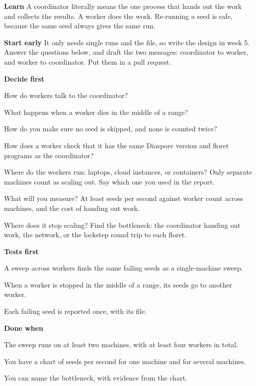 \documentclass[11pt,letterpaper]{article}
\newcommand{\code}[1]{\texttt{\detokenize{#1}}}
\newcommand{\lbl}[1]{\textbf{#1}\enspace}
\begin{document}
\lbl{Learn} A coordinator literally means the one process that hands out the work and collects the results. A worker does the work. Re-running a seed is safe, because the same seed always gives the same run.

\lbl{Start early} It only needs single runs and the \code{.pappus} file, so write the design in week 5. Answer the questions below, and draft the two messages: coordinator to worker, and worker to coordinator. Put them in a pull request.

\lbl{Decide first}
\begin{asks}
  \item How do workers talk to the coordinator?
  \item What happens when a worker dies in the middle of a range?
  \item How do you make sure no seed is skipped, and none is counted twice?
  \item How does a worker check that it has the same Diaspore version and floret programs as the coordinator?
  \item Where do the workers run: laptops, cloud instances, or containers? Only separate machines count as scaling out. Say which one you used in the report.
  \item What will you measure? At least seeds per second against worker count across machines, and the cost of handing out work.
  \item Where does it stop scaling? Find the bottleneck: the coordinator handing out work, the network, or the lockstep round trip to each floret.
\end{asks}

\lbl{Tests first}
\begin{checks}
  \item A sweep across workers finds the same failing seeds as a single-machine sweep.
  \item When a worker is stopped in the middle of a range, its seeds go to another worker.
  \item Each failing seed is reported once, with its \code{.pappus} file.
\end{checks}

\lbl{Done when}
\begin{checks}
  \item The sweep runs on at least two machines, with at least four workers in total.
  \item You have a chart of seeds per second for one machine and for several machines.
  \item You can name the bottleneck, with evidence from the chart.
\end{checks}
\end{document}
